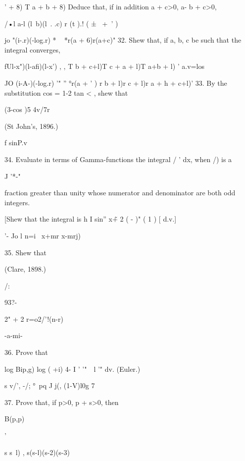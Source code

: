 ' + 8) T a + b + 8) 
Deduce that, if in addition a + c>0, a- b + c>0, 

/•l a-l (l\  b)(l\ . .c)   r (t ).! ( ± \ +\ ' ) 

jo "(i-.r)(-log.r)  * ~  *r(a + 6)r(a+c)" 
32. Shew that, if a, b, c be such that the integral converges, 

fUl-x")(l-afi)(l-x') , , T b + c+l)T c + a + l)T a+b + l) 
' a.v=los 



JO (i-A-)(-log.r) '" ''  °r(a + ' ) r b + l)r c + l)r a + h + c+l)' 
33. By the substitution cos   = 1-2 tan  < , shew that 

(3-cos )5 4v/7r 



(St John's, 1896.) 



f  sinP.v 

34. Evaluate in terms of Gamma-functions the integral / ' dx, when /) is a 

J '*-" 

fraction greater than unity whose numerator and denominator are both odd integers. 

[Shew that the integral is h I sin'' x\~+ 2 ( - )" ( 1 ) [ d.v.] 

'- Jo l  n=i \ x+mr x-mrj) 

35. Shew that 



(Clare, 1898.) 



/: 



93?- 



2" + 2 r=o2/'!(n-r) 



-a-mi- 



36. Prove that 



log Bip,g)  log ( +i) 4- I '  \: '"\ \  l '"  dv. (Euler.) 

s v/', -/; °\ pq J j(, (1-V)l0g 7 



37. Prove that, if p>0, p + s>0, then 



B(p,p) 



 ' 



s s~l) , s(s-l)(s-2)(s-3) 



